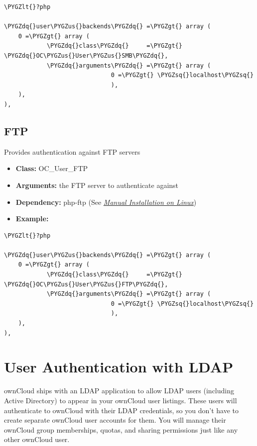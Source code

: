 \documentclass[letterpaper,10pt,english]{sphinxmanual}
\def\PYGZus{\char`\_}
\def\PYGZlt{\char`\<}
\def\PYGZgt{\char`\>}
\def\PYGZsq{\char`\'}
\def\PYGZdq{\char`\"}
\begin{document}
\begin{Verbatim}[commandchars=\\\{\}]
\PYGZlt{}?php

\PYGZdq{}user\PYGZus{}backends\PYGZdq{} =\PYGZgt{} array (
    0 =\PYGZgt{} array (
            \PYGZdq{}class\PYGZdq{}     =\PYGZgt{} \PYGZdq{}OC\PYGZus{}User\PYGZus{}SMB\PYGZdq{},
            \PYGZdq{}arguments\PYGZdq{} =\PYGZgt{} array (
                              0 =\PYGZgt{} \PYGZsq{}localhost\PYGZsq{}
                              ),
    ),
),
\end{Verbatim}


\subsection{FTP}
\label{configuration_user/user_auth_ftp_smb_imap:ftp}
Provides authentication against FTP servers
\begin{itemize}
\item {} 
\textbf{Class:} OC\_User\_FTP

\item {} 
\textbf{Arguments:} the FTP server to authenticate against

\item {} 
\textbf{Dependency:} php-ftp (See {\hyperref[installation/source_installation::doc]{\emph{Manual Installation on Linux}}})

\item {} 
\textbf{Example:}

\end{itemize}

\begin{Verbatim}[commandchars=\\\{\}]
\PYGZlt{}?php

\PYGZdq{}user\PYGZus{}backends\PYGZdq{} =\PYGZgt{} array (
    0 =\PYGZgt{} array (
            \PYGZdq{}class\PYGZdq{}     =\PYGZgt{} \PYGZdq{}OC\PYGZus{}User\PYGZus{}FTP\PYGZdq{},
            \PYGZdq{}arguments\PYGZdq{} =\PYGZgt{} array (
                              0 =\PYGZgt{} \PYGZsq{}localhost\PYGZsq{}
                              ),
    ),
),
\end{Verbatim}


\section{User Authentication with LDAP}
\label{configuration_user/user_auth_ldap::doc}\label{configuration_user/user_auth_ldap:user-authentication-with-ldap}
ownCloud ships with an LDAP application to allow LDAP users (including Active
Directory) to appear in your ownCloud user listings. These users will
authenticate to ownCloud with their LDAP credentials, so you don't have to
create separate ownCloud user accounts for them. You will manage their ownCloud
group memberships, quotas, and sharing permissions just like any other ownCloud
user.
\end{document}
